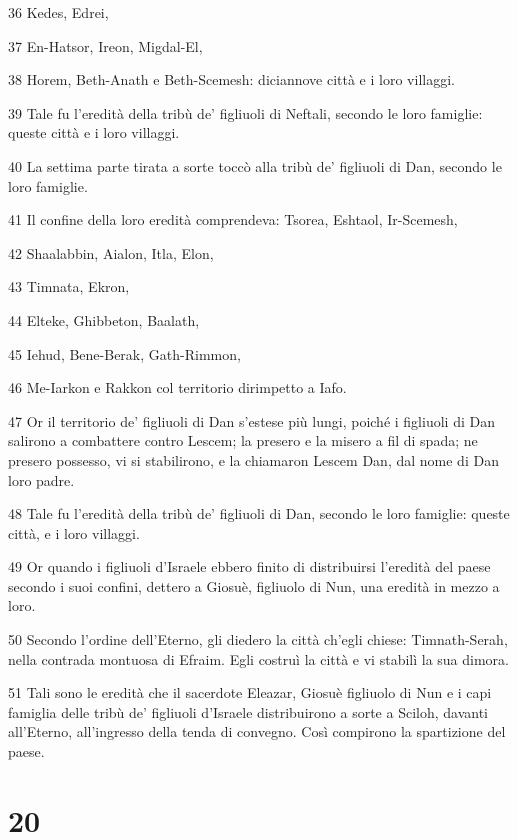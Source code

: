 \par 36 Kedes, Edrei,
\par 37 En-Hatsor, Ireon, Migdal-El,
\par 38 Horem, Beth-Anath e Beth-Scemesh: diciannove città e i loro villaggi.
\par 39 Tale fu l'eredità della tribù de' figliuoli di Neftali, secondo le loro famiglie: queste città e i loro villaggi.
\par 40 La settima parte tirata a sorte toccò alla tribù de' figliuoli di Dan, secondo le loro famiglie.
\par 41 Il confine della loro eredità comprendeva: Tsorea, Eshtaol, Ir-Scemesh,
\par 42 Shaalabbin, Aialon, Itla, Elon,
\par 43 Timnata, Ekron,
\par 44 Elteke, Ghibbeton, Baalath,
\par 45 Iehud, Bene-Berak, Gath-Rimmon,
\par 46 Me-Iarkon e Rakkon col territorio dirimpetto a Iafo.
\par 47 Or il territorio de' figliuoli di Dan s'estese più lungi, poiché i figliuoli di Dan salirono a combattere contro Lescem; la presero e la misero a fil di spada; ne presero possesso, vi si stabilirono, e la chiamaron Lescem Dan, dal nome di Dan loro padre.
\par 48 Tale fu l'eredità della tribù de' figliuoli di Dan, secondo le loro famiglie: queste città, e i loro villaggi.
\par 49 Or quando i figliuoli d'Israele ebbero finito di distribuirsi l'eredità del paese secondo i suoi confini, dettero a Giosuè, figliuolo di Nun, una eredità in mezzo a loro.
\par 50 Secondo l'ordine dell'Eterno, gli diedero la città ch'egli chiese: Timnath-Serah, nella contrada montuosa di Efraim. Egli costruì la città e vi stabilì la sua dimora.
\par 51 Tali sono le eredità che il sacerdote Eleazar, Giosuè figliuolo di Nun e i capi famiglia delle tribù de' figliuoli d'Israele distribuirono a sorte a Sciloh, davanti all'Eterno, all'ingresso della tenda di convegno. Così compirono la spartizione del paese.

\chapter{20}

